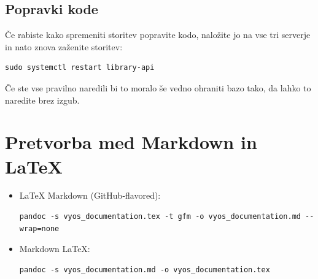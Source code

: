 \documentclass[a4paper,11pt]{article}
\begin{document}
\subsection{Popravki kode}
Če rabiste kako spremeniti storitev popravite kodo, naložite jo na vse tri serverje in nato znova zaženite storitev:
\begin{lstlisting}
sudo systemctl restart library-api
\end{lstlisting}
Če ste vse pravilno naredili bi to moralo še vedno ohraniti bazo tako, da lahko to naredite brez izgub.


\section{Pretvorba med Markdown in LaTeX}
\begin{itemize}
  \item LaTeX \textrightarrow{} Markdown (GitHub-flavored):
\begin{lstlisting}
pandoc -s vyos_documentation.tex -t gfm -o vyos_documentation.md --wrap=none
\end{lstlisting}

  \item Markdown \textrightarrow{} LaTeX:
\begin{lstlisting}
pandoc -s vyos_documentation.md -o vyos_documentation.tex
\end{lstlisting}
\end{itemize}
\end{document}
